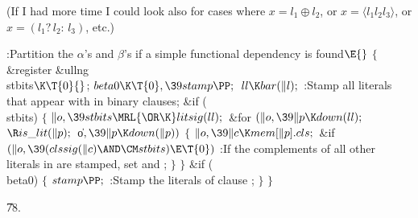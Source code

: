 (If I had more time I could look also for cases where $x=l_1\oplus l_2$,
or $x=\langle l_1l_2l_3\rangle$, or $x=(l_1{?}\,l_2{:}\, l_3)$, etc.)

\Y\B\4:Partition the $\alpha$'s and $\beta$'s if a simple functional
dependency is found\X${}\E{}$\6
${}\{{}$\1\6
\&{register} \&{ullng} \\{stbits}${}\K\T{0}{}$;\7
${}\\{beta0}\K\T{0},\39\\{stamp}\PP;{}$\6
${}\\{ll}\K\\{bar}(\|l);{}$\6
:Stamp all literals that appear with  in binary clauses\X;\6
\&{if} (\\{stbits})\5
${}\{{}$\1\6
${}\|o,\39\\{stbits}\MRL{{\OR}{\K}}\\{litsig}(\\{ll});{}$\6
\&{for} ${}(\|o,\39\|p\K\\{down}(\\{ll});{}$ ${}\R\\{is\_lit}(\|p);{}$ \|o${},%
\39\|p\K\\{down}(\|p)){}$\5
${}\{{}$\1\6
${}\|o,\39\|c\K\\{mem}[\|p].\\{cls};{}$\6
\&{if} ${}(\|o,\39(\\{clssig}(\|c)\AND\CM\\{stbits})\E\T{0}){}$\1\5
:If the complements of all other literals in  are stamped, set %
 and \X;\2\6
\4${}\}{}$\2\6
\4${}\}{}$\2\6
\&{if} (\\{beta0})\5
${}\{{}$\1\6
${}\\{stamp}\PP;{}$\6
:Stamp the literals of clause \X;\6
\4${}\}{}$\2\6
\4${}\}{}$\2\par
\U78.\fi

